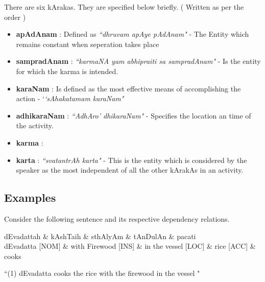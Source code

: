 \documentclass[twoside]{article}
\begin{document}
There are six kArakas. They are specified below briefly. ( Written as per the order )

  \begin{itemize}
    \item \textbf{apAdAnam}  :  Defined as \textit{``dhruvam apAye pAdAnam"} - The Entity which remains constant when seperation takes place 
    \item \textbf{sampradAnam}  : \textit{``karmaNA yam abhipraiti sa sampradAnam"} - Is the entity for which the karma is intended. 
    \item \textbf{karaNam} : Is defined as the most effective means of accomplishing the action - `\textit{`sAhakatamam karaNam"}
    \item \textbf{adhikaraNam} : \textit{``AdhAro' dhikaraNam"} - Specifies the location an time of the activity.
    \item \textbf{karma} :  
    \item \textbf{karta} : \textit{``svatantrAh karta"} - This is the entity which is considered by the speaker as the most independent of all the other kArakAs in an activity.
  \end{itemize}

\subsection{Examples}
Consider the following sentence and its respective dependency relations.

\hypertarget{fig1}{}
\begin{center}
\begin{dependency}[arc edge, arc angle=80, text only label, label style={above}]
   \begin{deptext}[column sep=1em]
      
      dEvadattah \& kAshTaih \& sthAlyAm \& tAnDulAn \& pacati \\
      dEvadatta [NOM] \& with Firewood [INS] \& in the vessel [LOC] \& rice [ACC]  \& cooks \\
   \end{deptext}
   
\end{dependency} 

 ``(1) dEvadatta cooks the rice with the firewood in the vessel " 
 

\end{center}
\end{document}
